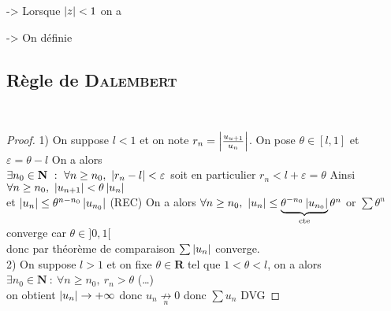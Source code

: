 
		\hspace*{2.5cm} -> Lorsque $\left\vert z \right\vert < 1$ on a 
		
		\hspace*{2.5cm} -> On définie  \medskip \\

	\subsection{Règle de \textsc{Dalembert}}

		~ \medskip \\

		\begin{proof}
			{\small 1)} On suppose $l<1$ et on note $r_n = \left\vert \frac{u_{u+1}}{u_n} \right\vert$. On pose $\theta \in [l,1] $ et $\varepsilon = \theta -l$
			On a alors \\ $\exists n_0 \in \mathbf{N} ~:~ \forall n\geq n_0 ,~\left\vert r_n -l \right\vert <\varepsilon$  soit en particulier $r_n < l+\varepsilon 
			=\theta$ Ainsi $\forall n\geq n_0 ,~\left\vert u_{n+1} \right\vert < \theta\left\vert u_n \right\vert$ \\ et $ \left\vert u_n \right\vert \leq \theta^{n-n_0} \left\vert u_{n_0} \right\vert$ {\small (REC) }
			On a alors $\forall n\geq n_0 ,~\left\vert u_n \right\vert \leq \underbrace{\theta^{-n_0} \left\vert u_{n_0} \right\vert}_{\mathrm{cte}} \theta^n$ 
			or $\sum\theta^n$ converge car $\theta \in ]0,1[$ \\donc par théorème de comparaison $\sum \left\vert u_n \right\vert $ converge.
			\vspace*{0.2cm}\\ {\small 2)} On suppose $l>1$ et on fixe $\theta \in \mathbf{R}$ tel que $ 1<\theta <l$, 
			on a alors $\exists n_0 \in \mathbf{N} ~:~\forall n\geq n_0 ,~r_n > \theta$ (\dots)\\
			on obtient $\left\vert u_n \right\vert \to +\infty$ donc $u_n \underset{n}{\nrightarrow} 0$ donc $\sum u_n$ DVG
		\end{proof} 
		
